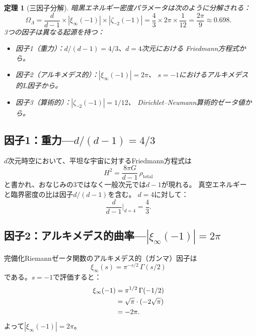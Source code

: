 \documentclass[12pt,a4paper]{article}
\newtheorem{theorem}{定理}[section]
\theoremstyle{definition}
\newcommand{\OmL}{\Omega_\Lambda}
\begin{document}
\begin{theorem}[三因子分解]\label{thm:three_factor}
暗黒エネルギー密度パラメータは次のように分解される：
\begin{equation}\label{eq:three_factor}
  \OmL = \frac{d}{d-1}\times|\xi_\infty(-1)|\times|\zeta_{\neg 2}(-1)|
       = \frac{4}{3}\times 2\pi \times \frac{1}{12}
       = \frac{2\pi}{9}
       \approx 0.698.
\end{equation}
3つの因子は異なる起源を持つ：
\begin{itemize}
  \item 因子1（重力）：$d/(d-1) = 4/3$、$d=4$次元における
    Friedmann方程式から。
  \item 因子2（アルキメデス的）：$|\xi_\infty(-1)| = 2\pi$、
    $s=-1$におけるアルキメデス的$L$因子から。
  \item 因子3（算術的）：$|\zeta_{\neg 2}(-1)| = 1/12$、
    Dirichlet--Neumann算術的ゼータ値から。
\end{itemize}
\end{theorem}

\subsection{因子1：重力---$d/(d-1) = 4/3$}

$d$次元時空において、平坦な宇宙に対するFriedmann方程式は
\[
  H^2 = \frac{8\pi G}{d-1}\,\rho_{\text{total}}
\]
と書かれ、おなじみの$3$ではなく一般次元では$d-1$が現れる。
真空エネルギーと臨界密度の比は因子$d/(d-1)$を含む。
$d=4$に対して：
\begin{equation}
  \frac{d}{d-1}\bigg|_{d=4} = \frac{4}{3}.
\end{equation}

\subsection{因子2：アルキメデス的曲率---$|\xi_\infty(-1)| = 2\pi$}

完備化Riemannゼータ関数のアルキメデス的（ガンマ）因子は
\begin{equation}
  \xi_\infty(s) = \pi^{-s/2}\,\Gamma(s/2)
\end{equation}
である。$s=-1$で評価すると：
\begin{align}
  \xi_\infty(-1)
    &= \pi^{1/2}\,\Gamma(-1/2) \notag\\
    &= \sqrt{\pi}\cdot(-2\sqrt{\pi}) \notag\\
    &= -2\pi.
\end{align}
よって$|\xi_\infty(-1)| = 2\pi$。
\end{document}
